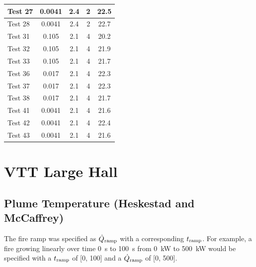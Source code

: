 \begin{table}[!ht]
\begin{center}
\begin{tabular}{|l|c|c|c|c|}
Test 27    &  0.0041           &  2.4       &  2              &  22.5                  \\ \hline
Test 28    &  0.0041           &  2.4       &  2              &  22.7                  \\ \hline
Test 31    &  0.105            &  2.1       &  4              &  20.2                  \\ \hline
Test 32    &  0.105            &  2.1       &  4              &  21.9                  \\ \hline
Test 33    &  0.105            &  2.1       &  4              &  21.7                  \\ \hline
Test 36    &  0.017            &  2.1       &  4              &  22.3                  \\ \hline
Test 37    &  0.017            &  2.1       &  4              &  22.3                  \\ \hline
Test 38    &  0.017            &  2.1       &  4              &  21.7                  \\ \hline
Test 41    &  0.0041           &  2.1       &  4              &  21.6                  \\ \hline
Test 42    &  0.0041           &  2.1       &  4              &  22.4                  \\ \hline
Test 43    &  0.0041           &  2.1       &  4              &  21.6                  \\ \hline
\end{tabular}
\end{center}
\end{table}


\clearpage


\section{VTT Large Hall}

\subsection*{Plume Temperature (Heskestad and McCaffrey)~\cite{SFPE:Heskestad, McCaffrey:NBSIR_79-1910}}

The fire ramp was specified as $\dot Q_{\rm ramp}$ with a corresponding $t_{\rm ramp}$.
For example, a fire growing linearly over time 0~s to 100~s from 0~kW to 500~kW
would be specified with a $t_{\rm ramp}$ of [0, 100] and a $\dot Q_{\rm ramp}$ of [0, 500].

